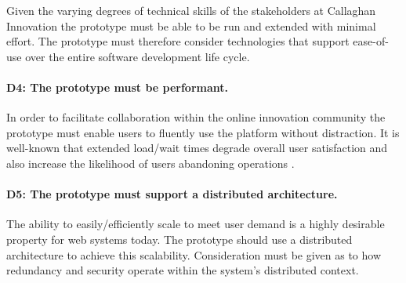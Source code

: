 Given the varying degrees of technical skills of the stakeholders at Callaghan Innovation the prototype must be able to be run and extended with minimal effort. The prototype must therefore consider technologies that support ease-of-use over the entire software development life cycle.

\paragraph{D4: The prototype must be performant.}

In order to facilitate collaboration within the online innovation community the prototype must enable users to fluently use the platform without distraction. It is well-known that extended load/wait times degrade overall user satisfaction and also increase the likelihood of users abandoning operations \cite{SiteSpeed1:online}\cite{TheAverage:online}\cite{HowL7:online}.

\paragraph{D5: The prototype must support a distributed architecture.}

The ability to easily/efficiently scale to meet user demand is a highly desirable property for web systems today. The prototype should use a distributed architecture to achieve this scalability. Consideration must be given as to how redundancy and security operate within the system's distributed context.

